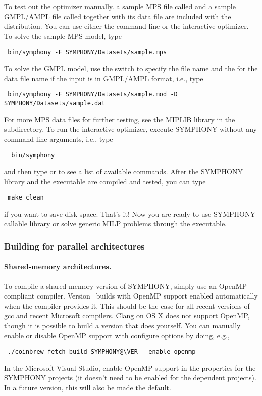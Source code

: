 To test out the optimizer manually. a
sample MPS file called  and a sample GMPL/AMPL file called
 together with its data file
 are included with the distribution. You can
use either the command-line or the interactive optimizer. To solve the sample
MPS model, type
{\color{brown}
\begin{verbatim}
 bin/symphony -F SYMPHONY/Datasets/sample.mps
\end{verbatim}
} To solve the GMPL model, use the  switch to specify the file name
and the  for the data file name if the input is in GMPL/AMPL format,
i.e., type 
{\color{brown}
\begin{verbatim}
 bin/symphony -F SYMPHONY/Datasets/sample.mod -D SYMPHONY/Datasets/sample.dat
\end{verbatim}}
For more MPS data files for further testing, see the MIPLIB library in the
 subdirectory. To run the interactive optimizer, execute SYMPHONY
without any command-line arguments, i.e., type
{\color{brown}
\begin{verbatim}
  bin/symphony 
\end{verbatim}}
and then type  or  to see a list of available commands.
After the SYMPHONY library and the executable are compiled and tested, you
can type
{\color{brown}
\begin{verbatim}
 make clean 
\end{verbatim}}
if you want to save disk space. That's it! Now you are ready to use SYMPHONY
callable library or solve generic MILP problems through the executable.

\subsubsection{Building for parallel architectures}

\paragraph{Shared-memory architectures.}

To compile a shared memory version of SYMPHONY, simply use an OpenMP compliant
compiler. Version \VER\  builds with OpenMP support enabled automatically when
the compiler provides it. This should be the case for all recent versions of
gcc and recent Microsoft compilers. Clang on OS X does not support OpenMP,
though it is possible to build a version that does yourself. You can manually
enable or disable OpenMP support with configure options by doing, e.g.,
{\color{brown}
\begin{verbatim}
 ./coinbrew fetch build SYMPHONY@\VER --enable-openmp
\end{verbatim}
} 
In the Microsoft Visual Studio, enable OpenMP
support in the properties for the SYMPHONY projects (it doesn't need to be
enabled for the dependent projects). In a future version, this will also be
made the default.

